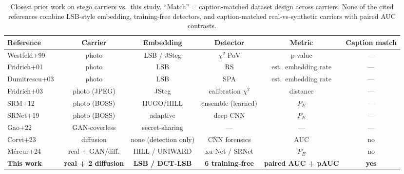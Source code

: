 \documentclass[10pt,twocolumn,a4paper]{article}
\begin{document}
\begin{table}[t]
\centering\footnotesize
\caption{Closest prior work on stego carriers vs.\ this study. ``Match'' = caption-matched dataset design across carriers. None of the cited references combine LSB-style embedding, training-free detectors, and caption-matched real-vs-synthetic carriers with paired AUC contrasts.}
\label{tab:relatedwork}
\setlength{\tabcolsep}{8pt}\renewcommand{\arraystretch}{1.15}
\begin{tabular}{@{}l c c c c c@{}}
\toprule
\textbf{Reference} & \textbf{Carrier} & \textbf{Embedding} & \textbf{Detector} & \textbf{Metric} & \textbf{Caption match} \\
\midrule
Westfeld+99~\cite{westfeld1999chi}      & photo            & LSB / JSteg     & $\chi^2$ PoV          & p-value    & --- \\
Fridrich+01~\cite{fridrich2001lsb}      & photo            & LSB             & RS                    & est.\ embedding rate & --- \\
Dumitrescu+03~\cite{dumitrescu2003sp}   & photo            & LSB             & SPA                   & est.\ embedding rate & --- \\
Fridrich+03~\cite{fridrich2003calib}    & photo (JPEG)     & JSteg           & calibration $\chi^2$  & distance   & --- \\
SRM+12~\cite{fridrich2012srm}           & photo (BOSS)     & HUGO/HILL       & ensemble (learned)    & $P_E$      & --- \\
SRNet+19~\cite{boroumand2019srnet}      & photo (BOSS)     & adaptive        & deep CNN              & $P_E$      & --- \\
Gao+22~\cite{gao2022ai}                 & GAN-coverless    & secret-sharing  & ---                   & ---        & --- \\
Corvi+23~\cite{corvi2023diffusion}      & diffusion        & none (detection only) & CNN forensics   & AUC        & no  \\
M\'ereur+24~\cite{mereur2024deepfake}   & real + GAN/diff. & HILL / UNIWARD  & xu-Net / SRNet        & $P_E$      & no  \\
\midrule
\textbf{This work} & \textbf{real + 2 diffusion} & \textbf{LSB / DCT-LSB} & \textbf{6 training-free} & \textbf{paired AUC + pAUC} & \textbf{yes} \\
\bottomrule
\end{tabular}
\end{table}
\end{document}
